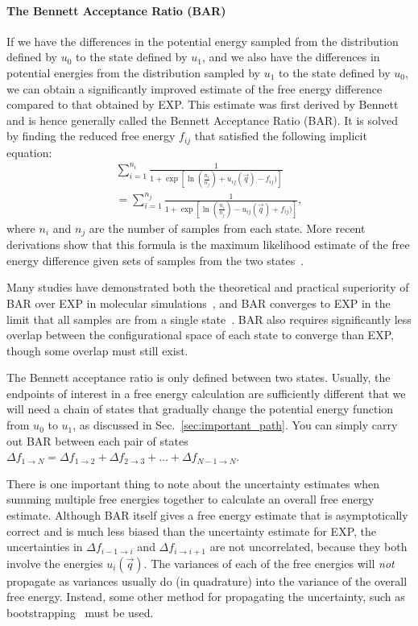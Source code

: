 \documentclass[9pt,bestpractices]{livecoms}
\begin{document}
\paragraph{The Bennett Acceptance Ratio (BAR)}
If we have the differences in the potential energy sampled from the distribution defined by $u_0$ to the state defined by $u_1$, and we also have the differences in potential energies from the distribution sampled by $u_1$ to the state defined by $u_0$, we can obtain a significantly improved estimate of the
free energy difference compared to that obtained by EXP. 
This estimate was first derived by Bennett and is hence generally called the Bennett Acceptance Ratio (BAR). It is solved by finding the reduced free energy $f_{ij}$ that satisfied the following implicit equation:
\begin{eqnarray}
 \sum_{i=1}^{n_i} \frac{1}{1 + \exp[\ln(\frac{n_i}{n_j}) + u_{ij}(\vec{q}) - f_{ij})
 ]} \nonumber \\
 =\sum_{i=1}^{n_j} \frac{1}{1 + \exp[\ln(\frac{n_i}{n_j}) - u_{ij}(\vec{q}) + f_{ij})]},
\end{eqnarray}
where $n_i$ and $n_j$ are the number of samples from each state. More recent derivations show that this formula is the maximum likelihood estimate of the free energy difference given sets of samples from the two states~\cite{shirts2003equilibriuma}. 

Many studies have demonstrated both the theoretical and practical superiority of BAR over EXP in molecular
simulations~\cite{shirts2005comparison,lu2003appropriate}, and BAR converges to EXP in the limit that all samples are from a single state~\cite{bennett1976efficient,bennett1976efficient,shirts2003equilibriuma}. BAR also requires significantly less overlap between the configurational space of each state to converge than EXP, though some overlap must still exist.

The Bennett acceptance ratio is only defined between two states. Usually, the endpoints of interest in a free energy calculation are sufficiently different that we will need a chain of states that gradually change the potential energy function from $u_0$ to $u_1$, as discussed in Sec.~\ref{sec:important_path}. You can simply carry out BAR between each pair of states $\Delta f_{1 \rightarrow N} = \Delta {f_{1\rightarrow 2}} + \Delta {f_{2\rightarrow 3}} +  \ldots + \Delta f_{N-1\rightarrow N}$.

There is one important thing to note about the uncertainty estimates when summing multiple free energies together to calculate an overall free energy estimate. Although BAR itself gives a free energy estimate that is asymptotically correct and is much less biased than the uncertainty estimate for EXP, the uncertainties in $\Delta {f_{i-1\rightarrow i}}$ and $\Delta {f_{i\rightarrow i+1}}$ are not uncorrelated, because they both involve the energies $u_i(\vec{q})$. The variances of each of the free energies will \textit{not} propagate as variances usually do (in quadrature) into the variance of the overall free energy. Instead, some other method for propagating the uncertainty, such as bootstrapping~\cite{grossfield2018best} must be used.
\end{document}
